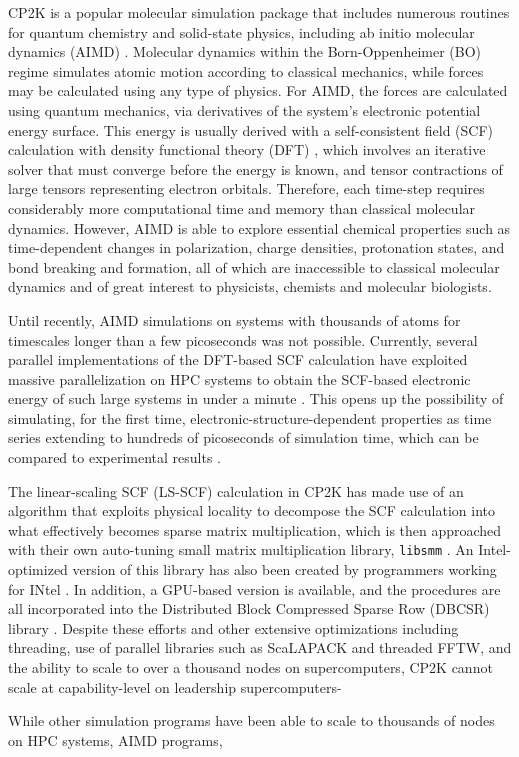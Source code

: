 CP2K \cite{hutter2014cp2k} is a popular molecular simulation package that includes numerous routines for quantum chemistry and solid-state physics, including ab initio molecular dynamics (AIMD) \cite{marx2009ab}. Molecular dynamics within the Born-Oppenheimer (BO) regime simulates atomic motion  according to classical mechanics, while forces may be calculated using any type of physics. For AIMD, the forces are calculated using quantum mechanics, via derivatives of the system's electronic potential energy surface. This energy is usually derived with a self-consistent field (SCF) calculation with density functional theory (DFT) \cite{vandevondele2012linear,hutter2014cp2k}, which involves an iterative solver that must converge before the energy is known, and tensor contractions of large tensors representing electron orbitals. Therefore, each time-step requires considerably more computational time and memory than classical molecular dynamics. However, AIMD is able to explore essential chemical properties such as time-dependent changes in polarization, charge densities, protonation states, and bond breaking and formation, all of which are inaccessible to classical molecular dynamics and of great interest to physicists, chemists and molecular biologists.

Until recently, AIMD simulations on systems with thousands of atoms for timescales longer than a few picoseconds was not possible. Currently, several parallel implementations of the DFT-based SCF calculation have exploited massive parallelization on HPC systems to obtain the SCF-based electronic energy of such large systems in under a minute \cite{vasp_bench,kresse1996efficient,cp2k_bench,vandevondele2012linear}. This opens up the possibility of simulating, for the first time, electronic-structure-dependent properties as time series extending to hundreds of picoseconds of simulation time, which can be compared to experimental results \cite{gillan2016perspective, pestana2017ab, hassanali2013proton, milovanovic2018new, sellner2013charge}.

The linear-scaling SCF (LS-SCF) calculation \cite{vandevondele2012linear} in CP2K has made use of an algorithm that exploits physical locality to decompose the SCF calculation into what effectively becomes sparse matrix multiplication, which is then approached with their own auto-tuning small matrix multiplication library, \texttt{libsmm} \cite{borvstnik2014sparse}. An Intel-optimized version of this library has also been created by programmers working for INtel \cite{heinecke2016libxsmm}. In addition, a GPU-based version is available, and the procedures are all incorporated into the Distributed Block Compressed Sparse Row (DBCSR) library \cite{borvstnik2014sparse,schutt2016gpu}. Despite these efforts and other extensive optimizations including  threading, use of parallel libraries such as ScaLAPACK and threaded FFTW, and the ability to scale to over a thousand nodes on supercomputers, CP2K cannot scale at capability-level on leadership supercomputers- 

While other simulation programs have been able to scale to thousands of nodes on HPC systems, AIMD programs, 